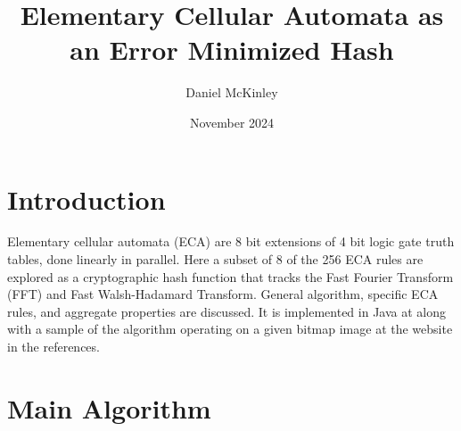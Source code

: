\documentclass[11pt]{article}
\title{Elementary Cellular Automata as an Error Minimized Hash}
\date{November 2024}
\author{Daniel McKinley}
\begin{document}
\maketitle

\section{Introduction}

Elementary cellular automata (ECA) are 8 bit extensions of 4 bit logic gate truth tables, done linearly in parallel. \cite{Wolfram}
Here a subset of 8 of the 256 ECA rules are explored as a cryptographic hash function that tracks the Fast Fourier Transform (FFT) and Fast Walsh-Hadamard Transform. General algorithm, specific ECA rules, and aggregate properties are discussed. It is implemented in Java at \cite{mygit} along with a sample of the algorithm operating on a given bitmap image at the website in the references. \\
\section{Main Algorithm}
\end{document}
